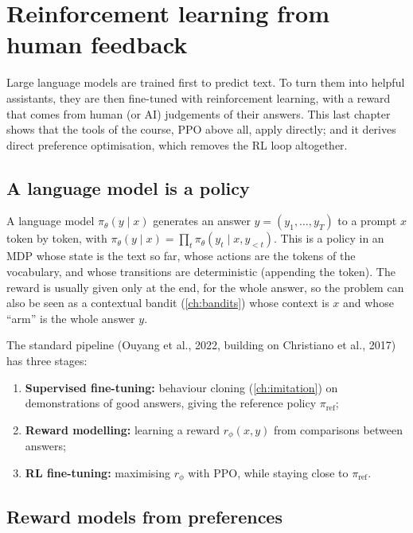 \chapter{Reinforcement learning from human feedback}
\label{ch:rlhf}

Large language models are trained first to predict text. To turn them into
helpful assistants, they are then fine-tuned with reinforcement learning,
with a reward that comes from human (or AI) judgements of their answers.
This last chapter shows that the tools of the course, PPO above all, apply
directly; and it derives direct preference optimisation, which removes the
RL loop altogether.

\section{A language model is a policy}

A language model $\pi_\theta(y \mid x)$ generates an answer $y = (y_1,
\dots, y_T)$ to a prompt $x$ token by token, with $\pi_\theta(y \mid x) =
\prod_t \pi_\theta(y_t \mid x, y_{<t})$. This is a policy in an MDP whose
state is the text so far, whose actions are the tokens of the vocabulary,
and whose transitions are deterministic (appending the token). The reward
is usually given only at the end, for the whole answer, so the problem can
also be seen as a contextual bandit (\cref{ch:bandits}) whose context is $x$
and whose ``arm'' is the whole answer $y$.

The standard pipeline (Ouyang et al., 2022, building on Christiano et al.,
2017) has three stages:
\begin{enumerate}[nosep]
  \item \textbf{Supervised fine-tuning:} behaviour cloning
    (\cref{ch:imitation}) on demonstrations of good answers, giving the
    reference policy $\pi_{\mathrm{ref}}$;
  \item \textbf{Reward modelling:} learning a reward $r_\phi(x, y)$ from
    comparisons between answers;
  \item \textbf{RL fine-tuning:} maximising $r_\phi$ with PPO, while staying
    close to $\pi_{\mathrm{ref}}$.
\end{enumerate}

\section{Reward models from preferences}

